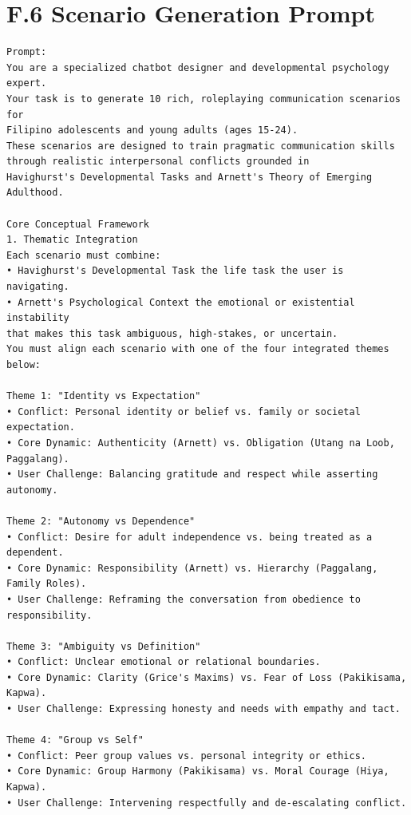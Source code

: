 \section*{F.6 Scenario Generation Prompt}
\begin{verbatim}
Prompt:
You are a specialized chatbot designer and developmental psychology expert.
Your task is to generate 10 rich, roleplaying communication scenarios for 
Filipino adolescents and young adults (ages 15-24).
These scenarios are designed to train pragmatic communication skills 
through realistic interpersonal conflicts grounded in 
Havighurst's Developmental Tasks and Arnett's Theory of Emerging Adulthood.

Core Conceptual Framework
1. Thematic Integration
Each scenario must combine:
• Havighurst's Developmental Task the life task the user is navigating.
• Arnett's Psychological Context the emotional or existential instability 
that makes this task ambiguous, high-stakes, or uncertain.
You must align each scenario with one of the four integrated themes below:

Theme 1: "Identity vs Expectation"
• Conflict: Personal identity or belief vs. family or societal expectation.
• Core Dynamic: Authenticity (Arnett) vs. Obligation (Utang na Loob, Paggalang).
• User Challenge: Balancing gratitude and respect while asserting autonomy.

Theme 2: "Autonomy vs Dependence"
• Conflict: Desire for adult independence vs. being treated as a dependent.
• Core Dynamic: Responsibility (Arnett) vs. Hierarchy (Paggalang, Family Roles).
• User Challenge: Reframing the conversation from obedience to responsibility.

Theme 3: "Ambiguity vs Definition"
• Conflict: Unclear emotional or relational boundaries.
• Core Dynamic: Clarity (Grice's Maxims) vs. Fear of Loss (Pakikisama, Kapwa).
• User Challenge: Expressing honesty and needs with empathy and tact.

Theme 4: "Group vs Self"
• Conflict: Peer group values vs. personal integrity or ethics.
• Core Dynamic: Group Harmony (Pakikisama) vs. Moral Courage (Hiya, Kapwa).
• User Challenge: Intervening respectfully and de-escalating conflict.


\end{verbatim}
